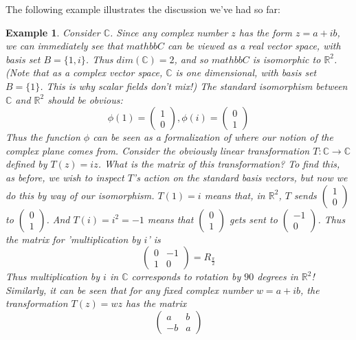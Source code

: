 \documentclass{article}
\theoremstyle{definition}
\theoremstyle{plain}
\newtheorem{example}{Example}[section]
\theoremstyle{theorem}
\begin{document}
The following example illustrates the discussion we've had so far:
\begin{example}
	Consider $\mathbb{C}$. Since any complex number $z$ has the form $z = a+ib$, we can immediately see that $mathbb{C}$ can be viewed as a \textit{real} vector space, with basis set $B = \{1,i\}$. Thus $dim(\mathbb{C}) = 2$, and so $mathbb{C}$ is isomorphic to $\mathbb{R}^2$. (Note that as a \textit{complex} vector space, $\mathbb{C}$ is one dimensional, with basis set $B = \{1\}$. This is why scalar fields don't mix!) The standard isomorphism between $\mathbb{C}$ and $\mathbb{R}^2$ should be obvious: 
	\[ \phi(1) = \begin{pmatrix} 1 \\ 0 \end{pmatrix}, \phi(i) = \begin{pmatrix} 0 \\ 1 \end{pmatrix} \]
	Thus the function $\phi$ can be seen as a formalization of where our notion of the \textit{complex plane} comes from. Consider the obviously linear transformation $T: \mathbb{C} \to \mathbb{C}$ defined by $T(z) = iz$. What is the matrix of this transformation? To find this, as before, we wish to inspect $T$'s action on the standard basis vectors, but now we do this by way of our isomorphism. $T(1) = i$ means that, in $\mathbb{R}^2$, $T$ sends $\begin{pmatrix} 1 \\ 0 \end{pmatrix}$ to $\begin{pmatrix} 0 \\ 1 \end{pmatrix}$. And $T(i) = i^2 = -1$ means that $\begin{pmatrix} 0 \\ 1 \end{pmatrix}$ gets sent to $\begin{pmatrix} -1 \\ 0 \end{pmatrix}$. Thus the matrix for 'multiplication by $i$' is 
	\[ \begin{pmatrix} 0 & -1 \\ 1 & 0 \end{pmatrix} = R_{\frac{\pi}{2}} \]
Thus multiplication by $i$ in $\mathbb{C}$ corresponds to rotation by $90$ degrees in $\mathbb{R}^2$! Similarly, it can be seen that for any fixed complex number $w = a+ib$, the transformation $T(z) = wz$ has the matrix
	\[ \begin{pmatrix} a & b \\ -b & a \end{pmatrix} \]

\end{example}
\end{document}
